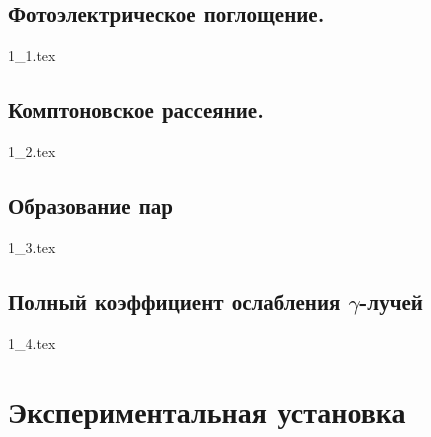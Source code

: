 \documentclass[a5paper, 10pt, twoside]{article} %
\begin{document}
  \subsection{Фотоэлектрическое поглощение.}
  {1_1.tex}

  \subsection{Комптоновское рассеяние.}
  {1_2.tex}

  \subsection{Образование пар}
  {1_3.tex}

  \subsection{Полный коэффициент ослабления $\gamma$-лучей}
  {1_4.tex}

\section{Экспериментальная установка}
\end{document}

